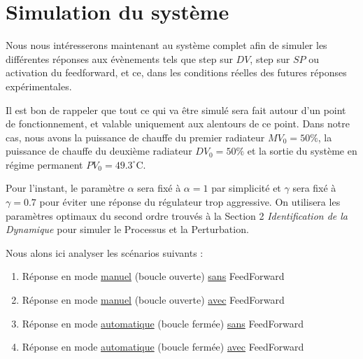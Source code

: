\section{Simulation du système}

Nous nous intéresserons maintenant au système complet afin de simuler les différentes réponses aux évènements tels que step sur $DV$, step sur $SP$ ou activation du feedforward, et ce, dans les conditions réelles des futures réponses expérimentales.

Il est bon de rappeler que tout ce qui va être simulé sera fait autour d'un point de fonctionnement, et valable uniquement aux alentours de ce point.
Dans notre cas, nous avons la puissance de chauffe du premier radiateur $MV_0 = 50\%$, la puissance de chauffe du deuxième radiateur $DV_0 = 50\%$ et la sortie du système en régime permanent $PV_0 = 49.3^{\circ}$C.

Pour l'instant, le paramètre $\alpha$ sera fixé à $\alpha = 1$ par simplicité et $\gamma$ sera fixé à $\gamma = 0.7$ pour éviter une réponse du régulateur trop aggressive.
On utilisera les paramètres optimaux du second ordre trouvés à la Section 2 \textit{Identification de la Dynamique} pour simuler le Processus et la Perturbation.

\noindent Nous alons ici analyser les scénarios suivants :
\begin{enumerate}
    \item Réponse en mode \underline{manuel} (boucle ouverte) \underline{sans} FeedForward
    \item Réponse en mode \underline{manuel} (boucle ouverte) \underline{avec} FeedForward
    \item Réponse en mode \underline{automatique} (boucle fermée) \underline{sans} FeedForward
    \item Réponse en mode \underline{automatique} (boucle fermée) \underline{avec} FeedForward
\end{enumerate}

